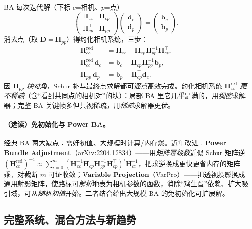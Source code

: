 \begin{derivation}
\label{thm:vo-schur-ba}
BA 每次迭代解（下标 $c$=相机、$p$=点）\cite{carlone2026handbook}
\[
  \begin{pmatrix}\mathbf{H}_{cc}&\mathbf{H}_{cp}\\\mathbf{H}_{cp}^\top&\mathbf{H}_{pp}\end{pmatrix}\begin{pmatrix}\mathbf{d}_c\\\mathbf{d}_p\end{pmatrix}=\begin{pmatrix}\mathbf{b}_c\\\mathbf{b}_p\end{pmatrix}.
\]
消去点（取 $\mathbf{D}=\mathbf{H}_{pp}$）得约化相机系统，三步：
\begin{align}
  \mathbf{H}_{cc}^{\text{red}}&=\mathbf{H}_{cc}-\mathbf{H}_{cp}\mathbf{H}_{pp}^{-1}\mathbf{H}_{cp}^\top,\label{eq:vo-schur-a}\\
  \mathbf{H}_{cc}^{\text{red}}\,\mathbf{d}_c&=\mathbf{b}_c-\mathbf{H}_{cp}\mathbf{H}_{pp}^{-1}\mathbf{b}_p,\label{eq:vo-schur-b}\\
  \mathbf{H}_{pp}\,\mathbf{d}_p&=\mathbf{b}_p-\mathbf{H}_{cp}^\top\mathbf{d}_c.\label{eq:vo-schur-c}
\end{align}
因 $\mathbf{H}_{pp}$ \emph{块对角}，Schur 补与最终点求解都可\emph{逐点}高效完成。约化相机系统 $\mathbf{H}_{cc}^{\text{red}}$ \emph{更不稀疏}（含“看到共同点的相机对”的块）：局部 BA 里它几乎是满的，用\emph{稠密}求解器；完整 BA 关键帧多但共视稀疏，用\emph{稀疏}求解器更优。
\end{derivation}

\paragraph{（选读）免初始化与 Power BA\cite{carlone2026handbook}。}经典 BA 两大缺点：需好初值、大规模时计算/内存爆。近年改进：\textbf{Power Bundle Adjustment}\cite{weber2023powerba}（arXiv:2204.12834）——用\emph{矩阵幂级数}近似 Schur 矩阵逆 $(\mathbf{H}_{cc}^{\text{red}})^{-1}\approx\sum_{i=0}^{m}(\mathbf{H}_{cc}^{-1}\mathbf{H}_{cp}\mathbf{H}_{pp}^{-1}\mathbf{H}_{cp}^\top)^i\mathbf{H}_{cc}^{-1}$，把求逆换成更快更省内存的矩阵乘，对截断 $m$ 可证收敛；\textbf{Variable Projection}（VarPro）——把透视投影换成通用射影矩阵，使路标可\emph{解析}地表为相机参数的函数，消除“鸡生蛋”依赖、扩大吸引域，可从\emph{随机初值}开始。二者结合给出大规模 BA 的免初始化可扩展解。

\subsection{完整系统、混合方法与新趋势}
\label{sec:vo-systems}


